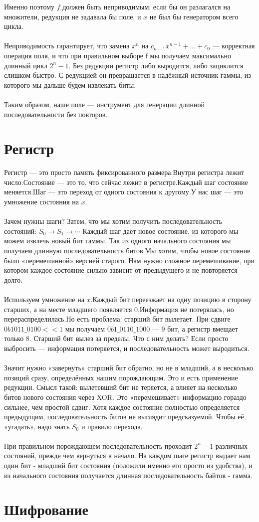 \documentclass{article}
\begin{document}
Именно поэтому $f$ должен быть неприводимым: если бы он разлагался на множители, редукция не задавала бы поле, и $x$ не был бы генератором всего цикла.
\\
\\
Неприводимость гарантирует, что замена $x^n$ на $c_{n-1} x^{n-1} + ... + c_0$ — корректная операция поля, и что при правильном выборе f мы получаем максимально длинный цикл $2 ^ {n}-1$. Без редукции регистр либо выродится, либо зациклится слишком быстро. С редукцией он превращается в надёжный источник гаммы, из которого мы дальше будем извлекать биты.
\\
\\
Таким образом, наше поле — инструмент для генерации длинной последовательности без повторов.


\section{Регистр}

 Регистр — это просто память фиксированного размера.Внутри регистра лежит число.Состояние — это то, что сейчас лежит в регистре.Каждый шаг состояние меняется.Шаг — это переход от одного состояния к другому.У нас шаг — это умножение состояния на $x$.
 \\
 \\
 Зачем нужны шаги? Затем, что мы хотим получить последовательность состояний:
$S_{0} \rightarrow  S_1 \rightarrow  \cdots$  Каждый шаг даёт новое состояние, из которого мы можем извлечь новый бит гаммы. Так из одного начального состояния мы получаем длинную последовательность битов.Мы хотим, чтобы новое состояние было «перемешанной» версией старого. Нам нужно сложное перемешивание, при котором каждое состояние сильно зависит от предыдущего и не повторяется долго.
\\
\\
Используем умножение на $x$.Каждый бит переезжает на одну позицию в сторону старших, а на месте младшего появляется 0.Информация не потерялась, но перераспределилась.Но есть проблема: старший бит вылетает. При сдвиге $0b1011\_0100 << 1$ мы получаем $0b1\_0110\_1000$ — 9 бит, а регистр вмещает только 8. Старший бит вылез за пределы.
Что с ним делать? Если просто выбросить — информация потеряется, и последовательность может выродиться.
\\
\\
Значит нужно «завернуть» старший бит обратно, но не в младший, а в несколько позиций сразу, определённых нашим порождающим. Это и есть применение редукции.
Смысл такой: вылетевший бит не теряется, а влияет на несколько битов нового состояния через XOR. Это «перемешивает» информацию гораздо сильнее, чем простой сдвиг. Хотя каждое состояние полностью определяется предыдущим, последовательность битов не выглядит предсказуемой. Чтобы её «угадать», надо знать $S_{0}$ и правило перехода. 
\\
\\
При правильном порождающем последовательность проходит $2^n - 1$ различных состояний, прежде чем вернуться в начало. На каждом шаге регистр выдает нам один бит - младший бит состояния (положили именно его просто из удобства), и из начального состояния получается длинная последовательность байтов - гамма.

\section{Шифрование}
\end{document}

